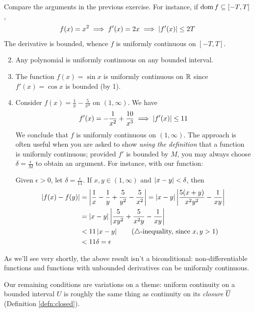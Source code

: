 \begin{examples}{}{}
	\exstart Compare the arguments in the previous exercise. For instance, if $\operatorname{dom} f\subseteq[-T,T]$,
	\[
		f(x)=x^2\implies f'(x)=2x
		\implies \left| f'(x)\right|\le 2T
	\]
	The derivative is bounded, whence $f$ is uniformly continuous on $[-T,T]$.
	
	\begin{enumerate}\setcounter{enumi}{1}
	  \item Any polynomial is uniformly continuous on any bounded interval.
	  
	  \item The function $f(x)=\sin x$ is uniformly continuous on $\mathbb{R}$ since $f'(x)=\cos x$ is bounded (by 1).
	  
	  \item Consider $f(x)=\frac 1x-\frac 5{x^2}$ on $(1,\infty)$. We have
	  \[
	  	f'(x)=-\frac 1{x^2}+\frac{10}{x^3}\implies \left| f'(x)\right|\le 11
	  \]
	  We conclude that $f$ is uniformly continuous on $(1,\infty)$.\smallbreak
	  The approach is often useful when you are asked to show \emph{using the definition} that a function is uniformly continuous; provided $f'$ is bounded by $M$, you may always choose $\delta=\frac\epsilon M$ to obtain an argument. For instance, with our function:\par
	  Given $\epsilon>0$, let $\delta=\frac\epsilon{11}$. If $x,y\in(1,\infty)$ and $\left| x-y\right|<\delta$, then
	  \begin{align*}
	  	\left| f(x)-f(y)\right| 
	  	&=\left| \frac 1x-\frac 1y+\frac 5{y^2}-\frac 5{x^2}\right| 
	  		=\left| x-y\right|\left| \frac{5(x+y)}{x^2y^2}-\frac 1{xy}\right|\\
	  	&=\left| x-y\right|\left| \frac 5{xy^2}+\frac 5{x^2y}-\frac 1{xy}\right|\\
	  	&< 11\left| x-y\right| \tag{$\triangle$-inequality, since $x,y>1$}\\
	  	&<11\delta =\epsilon
	  \end{align*}
	\end{enumerate}
\end{examples}

As we'll see very shortly, the above result isn't a biconditional: non-differentiable functions and functions with unbounded derivatives can be uniformly continuous.


\goodbreak


Our remaining conditions are variations on a theme: uniform continuity on a bounded interval $U$ is roughly the same thing as continuity on its \emph{closure} $\overline{U}$ (Definition \ref{defn:closed}). 


